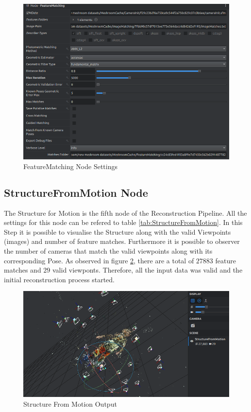 \documentclass[12pt]{report}
\begin{document}
\begin{figure}[H]%
  \centering
 \includegraphics[width=1\textwidth]{featurematchingNOde.png}
\caption{FeatureMatching Node Settings}
\label{fig:fEATUREmATCHING} 
\end{figure}

\subsection*{StructureFromMotion Node}
The Structure for Motion is the fifth node of the Reconstruction Pipeline. All the settings for this node can be refered to table \ref{tab:StructureFromMotion}.
In this Step it is possible to visualise the Structure along with the valid Viewpoints (images) and number of feature matches. Furthermore it is possible to observer
the number of cameras that match the valid viewpoints along with its corresponding Pose. As observed in figure \ref{fig:SFM_output}, there are a total of $27883$ feature matches and $29$ valid viewponts.
Therefore, all the input data was valid and the initial reconstruction process started. 

\begin{figure}[H]%
  \centering
 \includegraphics[width=1\textwidth]{SFM_example.png}
\caption{Structure From Motion Output}
\label{fig:SFM_output} 
\end{figure}
\end{document}
